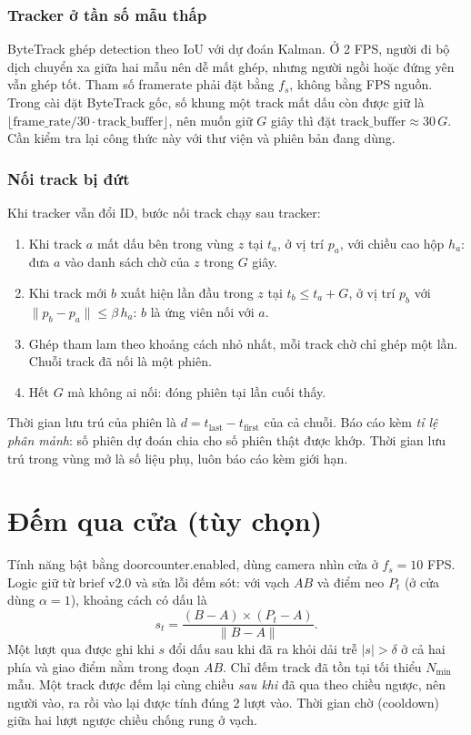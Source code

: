\documentclass[10pt,a4paper,oneside,openany]{report}
\newcommand{\breakus}{\textunderscore\allowbreak}
\newcommand{\code}[1]{{\ttfamily\let\_\breakus #1}}
\begin{document}
\subsubsection{Tracker ở tần số mẫu thấp}
ByteTrack ghép detection theo IoU với dự đoán Kalman. Ở 2 FPS, người đi bộ dịch chuyển xa giữa hai mẫu nên dễ mất ghép,
nhưng người ngồi hoặc đứng yên vẫn ghép tốt. Tham số \code{frame\_rate} phải đặt bằng $f_s$, không bằng FPS nguồn.
Trong cài đặt ByteTrack gốc, số khung một track mất dấu còn được giữ là $\lfloor \text{frame\_rate}/30 \cdot \text{track\_buffer} \rfloor$,
nên muốn giữ $G$ giây thì đặt $\text{track\_buffer} \approx 30\,G$. Cần kiểm tra lại công thức này với thư viện và phiên bản đang dùng.

\subsubsection{Nối track bị đứt}
Khi tracker vẫn đổi ID, bước nối track chạy sau tracker:
\begin{enumerate}
  \item Khi track $a$ mất dấu bên trong vùng $z$ tại $t_a$, ở vị trí $p_a$, với chiều cao hộp $h_a$: đưa $a$ vào danh sách chờ của $z$ trong $G$ giây.
  \item Khi track mới $b$ xuất hiện lần đầu trong $z$ tại $t_b \le t_a + G$, ở vị trí $p_b$ với $\|p_b - p_a\| \le \beta\,h_a$:
        $b$ là ứng viên nối với $a$.
  \item Ghép tham lam theo khoảng cách nhỏ nhất, mỗi track chờ chỉ ghép một lần. Chuỗi track đã nối là một phiên.
  \item Hết $G$ mà không ai nối: đóng phiên tại lần cuối thấy.
\end{enumerate}
Thời gian lưu trú của phiên là $d = t_{\text{last}} - t_{\text{first}}$ của cả chuỗi. Báo cáo kèm \emph{tỉ lệ phân mảnh}: số phiên dự đoán
chia cho số phiên thật được khớp. Thời gian lưu trú trong vùng mở là số liệu phụ, luôn báo cáo kèm giới hạn.

\section{Đếm qua cửa (tùy chọn)}\label{sec:cua}
Tính năng bật bằng \code{door\_counter.enabled}, dùng camera nhìn cửa ở $f_s = 10$ FPS. Logic giữ từ brief v2.0 và sửa lỗi đếm sót:
với vạch $AB$ và điểm neo $P_t$ (ở cửa dùng $\alpha = 1$), khoảng cách có dấu là
\begin{equation}
  s_t = \frac{(B - A) \times (P_t - A)}{\|B - A\|}.
\end{equation}
Một lượt qua được ghi khi $s$ đổi dấu sau khi đã ra khỏi dải trễ $|s| > \delta$ ở cả hai phía và giao điểm nằm trong đoạn $AB$.
Chỉ đếm track đã tồn tại tối thiểu $N_{\min}$ mẫu. Một track được đếm lại cùng chiều \emph{sau khi} đã qua theo chiều ngược,
nên người vào, ra rồi vào lại được tính đúng 2 lượt vào. Thời gian chờ (cooldown) giữa hai lượt ngược chiều chống rung ở vạch.
\end{document}
